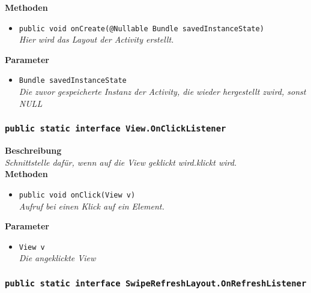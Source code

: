\documentclass[a4paper]{scrreprt}
\begin{document}
                \textbf{Methoden}
                \begin{itemize}
        		\item{\texttt{public void onCreate(@Nullable Bundle savedInstanceState)}}\\
                \textit{Hier wird das Layout der Activity erstellt.}\\
                \end{itemize}
                
                \textbf{Parameter}
                \begin{itemize}
        		\item\texttt{Bundle savedInstanceState}\\ 
                \textit{Die zuvor gespeicherte Instanz der Activity, die wieder hergestellt zwird, sonst NULL}\\
                \end{itemize}
                
    	\subsubsection{\texttt{public static interface View.OnClickListener}}
        
      	        \textbf{Beschreibung} \\
               	\textit{Schnittstelle dafür, wenn auf die View geklickt wird.klickt wird.}\\

                \textbf{Methoden}
                \begin{itemize}
                \item{\texttt{public void onClick(View v)}}\\
                \textit{Aufruf bei einen Klick auf ein Element.}\\
                \end{itemize}

                \textbf{Parameter}
                \begin{itemize}
                \item\texttt{View v}\\
                \textit{Die angeklickte View}\\
                \end{itemize} 
                
        \subsubsection{\texttt{public static interface SwipeRefreshLayout.OnRefreshListener}}
        
\end{document}
